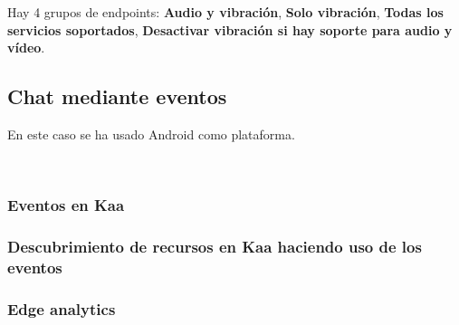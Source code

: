 \documentclass[12pt, twoside]{book}
\begin{document}
Hay 4 grupos de endpoints: \textbf{Audio y vibración}, \textbf{Solo vibración}, \textbf{Todas los servicios soportados}, \textbf{Desactivar vibración si hay soporte para audio y vídeo}. 

\subsection{Chat mediante eventos}
En este caso se ha usado Android como plataforma.




\



\subsubsection*{Eventos en Kaa}
\subsubsection*{Descubrimiento de recursos en Kaa haciendo uso de los eventos}

\subsubsection*{Edge analytics}
\end{document}
